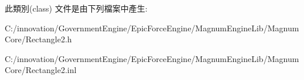 此類別(class) 文件是由下列檔案中產生\+:\begin{DoxyCompactItemize}
\item 
C\+:/innovation/\+Government\+Engine/\+Epic\+Force\+Engine/\+Magnum\+Engine\+Lib/\+Magnum\+Core/Rectangle2.\+h\item 
C\+:/innovation/\+Government\+Engine/\+Epic\+Force\+Engine/\+Magnum\+Engine\+Lib/\+Magnum\+Core/Rectangle2.\+inl\end{DoxyCompactItemize}
